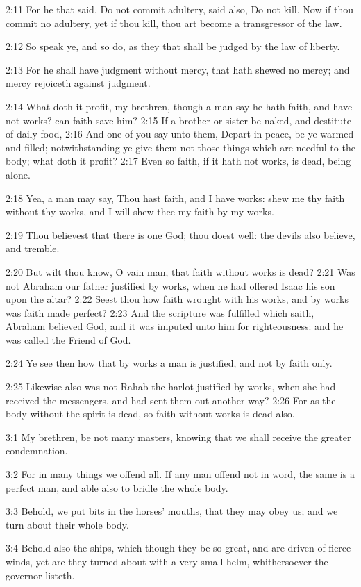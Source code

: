 2:11 For he that said, Do not commit adultery, said also, Do not kill.  Now if thou commit no adultery, yet if thou kill, thou art become a transgressor of the law.

2:12 So speak ye, and so do, as they that shall be judged by the law of liberty.

2:13 For he shall have judgment without mercy, that hath shewed no mercy; and mercy rejoiceth against judgment.

2:14 What doth it profit, my brethren, though a man say he hath faith, and have not works? can faith save him?  2:15 If a brother or sister be naked, and destitute of daily food, 2:16 And one of you say unto them, Depart in peace, be ye warmed and filled; notwithstanding ye give them not those things which are needful to the body; what doth it profit?  2:17 Even so faith, if it hath not works, is dead, being alone.

2:18 Yea, a man may say, Thou hast faith, and I have works: shew me thy faith without thy works, and I will shew thee my faith by my works.

2:19 Thou believest that there is one God; thou doest well: the devils also believe, and tremble.

2:20 But wilt thou know, O vain man, that faith without works is dead?  2:21 Was not Abraham our father justified by works, when he had offered Isaac his son upon the altar?  2:22 Seest thou how faith wrought with his works, and by works was faith made perfect?  2:23 And the scripture was fulfilled which saith, Abraham believed God, and it was imputed unto him for righteousness: and he was called the Friend of God.

2:24 Ye see then how that by works a man is justified, and not by faith only.

2:25 Likewise also was not Rahab the harlot justified by works, when she had received the messengers, and had sent them out another way?  2:26 For as the body without the spirit is dead, so faith without works is dead also.

3:1 My brethren, be not many masters, knowing that we shall receive the greater condemnation.

3:2 For in many things we offend all. If any man offend not in word, the same is a perfect man, and able also to bridle the whole body.

3:3 Behold, we put bits in the horses' mouths, that they may obey us; and we turn about their whole body.

3:4 Behold also the ships, which though they be so great, and are driven of fierce winds, yet are they turned about with a very small helm, whithersoever the governor listeth.

